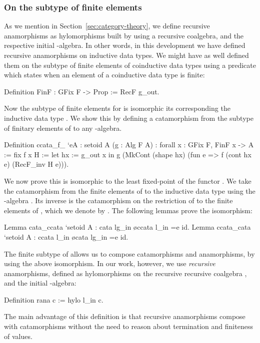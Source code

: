 \documentclass[a4paper,anonymous, UKenglish,cleveref, autoref, thm-restate]{lipics-v2021}
\begin{document}
\subsubsection{On the subtype of finite elements}
As we mention in
Section~\ref{sec:category-theory}, we define recursive anamorphisms as
hylomorphisms built by using a recursive coalgebra, and the respective
initial -algebra.
In other words, in this development we have defined recursive anamorphisms on
inductive data types.  We might have as well defined them on the subtype of
finite elements of coinductive data types using a predicate which states when an
element of a coinductive data type is finite:
\begin{coqcode}
Definition FinF : GFix F -> Prop := RecF g_out.
\end{coqcode}
Now the subtype  of finite elements for 
is isomorphic its corresponding the inductive data type .
We show this by
defining a catamorphism  from the
subtype  of finitary elements of  to
any -algebra.
\begin{coqcode}
Definition ccata_f_ `{eA : setoid A} (g : Alg F A)
  : forall x : GFix F, FinF x -> A := fix f x H :=
    let hx := g_out x in
      g (MkCont (shape hx) (fun e => f (cont hx e) (RecF_inv H e))).
\end{coqcode}
We now prove this is isomorphic to the least fixed-point of the functor
.
We take the catamorphism from the finite elements of  to the
inductive data type  using the -algebra . Its
inverse is the catamorphism on the restriction of  to the finite
elements of , which we denote by .  The following lemmas
prove the isomorphism:
\begin{coqcode}
Lemma cata_ccata `{setoid A} : cata lg_in \o ccata l_in =e id.
Lemma ccata_cata `{setoid A} : ccata l_in \o cata lg_in =e id.
\end{coqcode}
The finite subtype of  allows us to compose
catamorphisms and anamorphisms, by using the above isomorphism. In our work,
however, we use \emph{recursive} anamorphisms, defined as hylomorphisms on the
recursive recursive coalgebra , and the initial -algebra:
\begin{coqcode}
Definition rana c := hylo l_in c.
\end{coqcode}
The main advantage of this definition is that recursive anamorphisms compose
with catamorphisms without the need to reason about termination and finiteness
of values.
\end{document}
